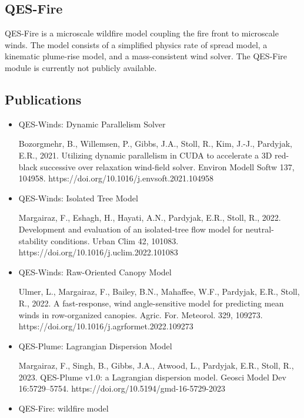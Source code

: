 \begin{itemize}
\subsection{QES-Fire}

QES-Fire is a microscale wildfire model coupling the fire front to microscale winds. The model consists of a simplified physics rate of spread model, a kinematic plume-rise model, and a mass-consistent wind solver. The QES-Fire module is currently not publicly available.


\subsection{Publications}

\begin{itemize}

\item QES-Winds: Dynamic Parallelism Solver

Bozorgmehr, B., Willemsen, P., Gibbs, J.A., Stoll, R., Kim, J.-J., Pardyjak, E.R., 2021. Utilizing dynamic parallelism in CUDA to accelerate a 3D red-black successive over relaxation wind-field solver. Environ Modell Softw 137, 104958. https://doi.org/10.1016/j.envsoft.2021.104958

\item QES-Winds: Isolated Tree Model

Margairaz, F., Eshagh, H., Hayati, A.N., Pardyjak, E.R., Stoll, R., 2022. Development and evaluation of an isolated-tree flow model for neutral-stability conditions. Urban Clim 42, 101083. https://doi.org/10.1016/j.uclim.2022.101083

\item QES-Winds: Raw-Oriented Canopy Model

Ulmer, L., Margairaz, F., Bailey, B.N., Mahaffee, W.F., Pardyjak, E.R., Stoll, R., 2022. A fast-response, wind angle-sensitive model for predicting mean winds in row-organized canopies. Agric. For. Meteorol. 329, 109273. https://doi.org/10.1016/j.agrformet.2022.109273

\item QES-Plume: Lagrangian Dispersion Model

Margairaz, F., Singh, B., Gibbs, J.A., Atwood, L., Pardyjak, E.R., Stoll, R., 2023. QES-Plume v1.0: a Lagrangian dispersion model. Geosci Model Dev 16:5729–5754. https://doi.org/10.5194/gmd-16-5729-2023

\item QES-Fire: wildfire model


\end{itemize}
\end{itemize}
